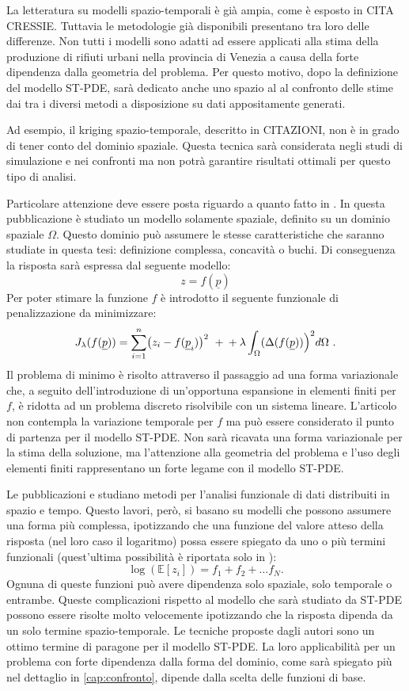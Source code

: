 \documentclass[a4paper,11pt,twoside,openright]{book}							%
\begin{document}
La letteratura su modelli spazio-temporali è già ampia, come è esposto in CITA CRESSIE. Tuttavia le metodologie già disponibili presentano tra loro delle differenze. Non tutti i modelli sono adatti ad essere applicati alla stima della produzione di rifiuti urbani nella provincia di Venezia a causa della forte dipendenza dalla geometria del problema. Per questo motivo, dopo la definizione del modello ST-PDE, sarà dedicato anche uno spazio al al confronto delle stime dai tra i diversi metodi a disposizione su dati appositamente generati.

Ad esempio, il kriging spazio-temporale, descritto in CITAZIONI, non è in grado di tener conto del dominio spaziale. Questa tecnica sarà considerata negli studi di simulazione e nei confronti ma non potrà garantire risultati ottimali per questo tipo di analisi.

Particolare attenzione deve essere posta riguardo a quanto fatto in \cite{art:sangalli}. In questa pubblicazione è studiato un modello solamente spaziale, definito su un dominio spaziale $\Omega$. Questo dominio può assumere le stesse caratteristiche che saranno studiate in questa tesi: definizione complessa, concavità o buchi. Di conseguenza la risposta sarà espressa dal seguente modello:
$$
z=f(\underline{p})
$$
Per poter stimare la funzione $f$ è introdotto il seguente funzionale di penalizzazione da minimizzare:
$$
J_{\lambda }(f(\underline p))=\sum_{i=1}^n \bigl( z_{i} - f(\underline p_i) \bigr)^2 \ + \\
+\lambda\int_{\Omega} ( \Delta(  f(\underline p)  ) \Bigr)^2 d \Omega \ .
$$
Il problema di minimo è risolto attraverso il passaggio ad una forma variazionale che, a seguito dell'introduzione di un'opportuna espansione in elementi finiti per $f$, è ridotta ad un problema discreto risolvibile con un sistema lineare. L'articolo \cite{art:sangalli} non contempla la variazione temporale per $f$ ma può essere considerato il punto di partenza per il modello ST-PDE. Non sarà ricavata una forma variazionale per la stima della soluzione, ma l'attenzione alla geometria del problema e l'uso degli elementi finiti rappresentano un forte legame con il modello ST-PDE.

Le pubblicazioni \cite{art:marra} e \cite{art:augustin} studiano metodi per l'analisi funzionale di dati distribuiti in spazio e tempo. Questo lavori, però, si basano su modelli che possono assumere una forma più complessa, ipotizzando che una funzione del valore atteso della risposta (nel loro caso il logaritmo) possa essere spiegato da uno o più termini funzionali (quest'ultima possibilità è riportata solo in \cite{art:augustin}):
$$
\log(\mathbb{E}[z_i])= f_1+f_2+ \ldots f_N .
$$
Ognuna di queste funzioni può avere dipendenza solo spaziale, solo temporale o entrambe. Queste complicazioni rispetto al modello che sarà studiato da ST-PDE possono essere risolte molto velocemente ipotizzando che la risposta dipenda da un solo termine spazio-temporale. Le tecniche proposte dagli autori sono un ottimo termine di paragone per il modello ST-PDE. La loro applicabilità per un problema con forte dipendenza dalla forma del dominio, come sarà spiegato più nel dettaglio in \ref{cap:confronto}, dipende dalla scelta delle funzioni di base. 
\end{document}
